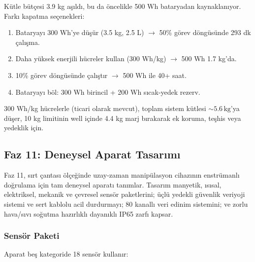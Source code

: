 Kütle bütçesi 3.9 kg aşıldı, bu da öncelikle 500 Wh bataryadan kaynaklanıyor. Farkı kapatma seçenekleri:
\begin{enumerate}
    \item Bataryayı 300 Wh'ye düşür (3.5 kg, 2.5 L) $\to$ 50\% görev döngüsünde 293 dk çalışma.
    \item Daha yüksek enerjili hücreler kullan (300 Wh/kg) $\to$ 500 Wh 1.7 kg'da.
    \item 10\% görev döngüsünde çalıştır $\to$ 500 Wh ile 40+ saat.
    \item Bataryayı böl: 300 Wh birincil + 200 Wh sıcak-yedek rezerv.
\end{enumerate}

300 Wh/kg hücrelerle (ticari olarak mevcut), toplam sistem kütlesi $\sim 5.6\,\text{kg}$'ya düşer, 10 kg limitinin well içinde 4.4 kg marj bırakarak ek koruma, teşhis veya yedeklik için.

\subsection{Faz 11: Deneysel Aparat Tasarımı}
\label{sec:phase11-experimental-tr}

Faz 11, sırt çantası ölçeğinde uzay-zaman manipülasyon cihazının enstrümanlı doğrulama için tam deneysel aparatı tanımlar. Tasarım manyetik, ısısal, elektriksel, mekanik ve çevresel sensör paketlerini; üçlü yedekli güvenlik veriyoji sistemi ve sert kablolu acil durdurmayı; 80 kanallı veri edinim sistemini; ve zorlu hava/sıvı soğutma hazırlıklı dayanıklı IP65 zarfı kapsar.

\subsubsection{Sensör Paketi}

Aparat beş kategoride 18 sensör kullanır:

